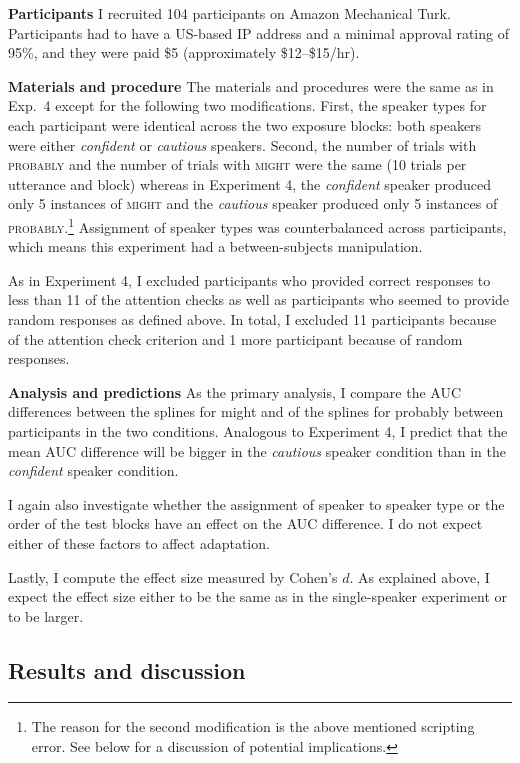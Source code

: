 \noindent \textbf{Participants} I recruited 104 participants on Amazon Mechanical Turk. 
Participants had to have a US-based IP address and a minimal approval rating of 
95\%, and they were paid \$5 (approximately \$12--\$15/hr).  

\noindent \textbf{Materials and procedure} The materials and procedures were the same as in Exp.~4 except for the following two modifications.
First, the speaker types for each participant were identical across the two exposure blocks: both speakers were either \textit{confident} or \textit{cautious} speakers.
Second, the number of trials with \textsc{probably} and the number of trials with \textsc{might} were the same (10 trials per utterance and block) whereas in Experiment 4, the \textit{confident} speaker
 produced only 5 instances of \textsc{might} and the \textit{cautious} speaker produced  only 5 instances of \textsc{probably}.\footnote{The reason for the second modification is the above mentioned scripting error. See below for a discussion of potential implications.} Assignment of speaker types was counterbalanced across participants, which means this experiment had a between-subjects manipulation.

  
As in Experiment 4, I excluded participants who provided correct responses to less than 11 of the attention checks as well as participants who seemed to provide random responses as defined above. In total, I excluded 11 participants because of the attention check criterion and 1 more participant because of random responses. 


\noindent \textbf{Analysis and predictions} 
As the primary analysis, I compare the AUC differences between the splines for 
{\sc might} and of the splines for {\sc probably} between participants in the two conditions.
Analogous to Experiment 4, I predict that the mean AUC difference
will be bigger in the \emph{cautious} speaker condition than in the \emph{confident} speaker condition.

I again also investigate whether the assignment of speaker to speaker type or the order 
of the test blocks have an effect on the AUC difference. I do not expect either of these factors
to affect adaptation.

Lastly, I compute the effect size measured by Cohen's $d$. As explained above, I expect
the effect size either to be the same as in the single-speaker experiment or to be larger. 


\subsection{Results and discussion}

